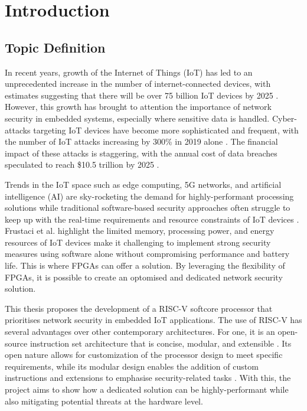 \chapter[Introduction]{Introduction}
\label{Chap:Introduction}

\section{Topic Definition}
In recent years, growth of the Internet of Things (IoT) has led to an unprecedented increase in the number of internet-connected devices, with estimates suggesting that there will be over 75 billion IoT devices by 2025 \cite{Alam2018}. However, this growth has brought to attention the importance of network security in embedded systems, especially where sensitive data is handled. Cyber-attacks targeting IoT devices have become more sophisticated and frequent, with the number of IoT attacks increasing by 300\% in 2019 alone \cite{Michael2019}. The financial impact of these attacks is staggering, with the annual cost of data breaches speculated to reach \$10.5 trillion by 2025 \cite{Morgan2020}. 

Trends in the IoT space such as edge computing, 5G networks, and artificial intelligence (AI) are sky-rocketing the demand for highly-performant processing solutions \cite{Nuttall2018} while traditional software-based security approaches often struggle to keep up with the real-time requirements and resource constraints of IoT devices \cite{Frustaci2018}. Frustaci et al. \cite{Frustaci2018} highlight the limited memory, processing power, and energy resources of IoT devices make it challenging to implement strong security measures using software alone without compromising performance and battery life. This is where FPGAs can offer a solution. By leveraging the flexibility of FPGAs, it is possible to create an optomised and dedicated network security solution.

This thesis proposes the development of a RISC-V softcore processor that prioritises network security in embedded IoT applications. The use of RISC-V has several advantages over other contemporary architectures. For one, it is an open-source instruction set architecture that is concise, modular, and extensible \cite{Patterson2017}. Its open nature allows for customization of the processor design to meet specific requirements, while its modular design enables the addition of custom instructions and extensions to emphasise security-related tasks \cite{Waterman2016}. With this, the project aims to show how a dedicated solution can be highly-performant while also mitigating potential threats at the hardware level.

